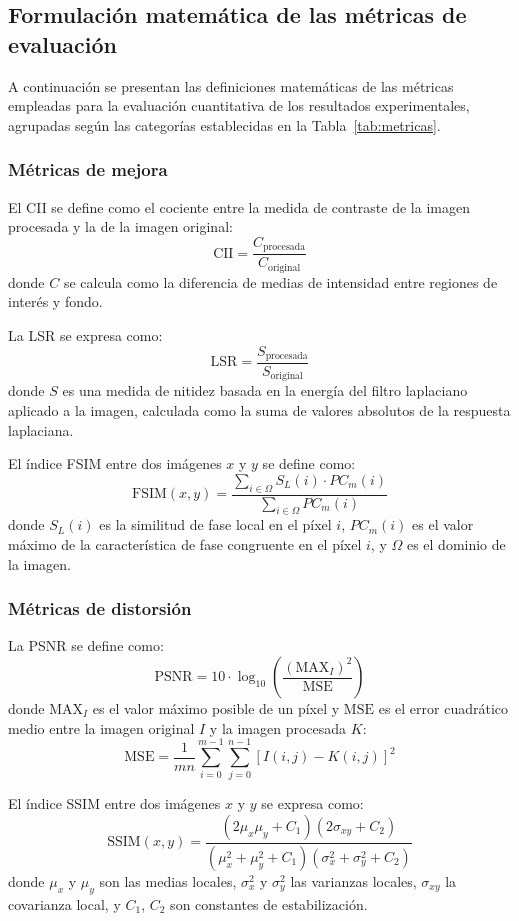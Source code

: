\subsection{Formulación matemática de las métricas de evaluación}

A continuación se presentan las definiciones matemáticas de las métricas empleadas para la evaluación cuantitativa de los resultados experimentales, agrupadas según las categorías establecidas en la Tabla~\ref{tab:metricas}.

\subsubsection{Métricas de mejora}

El CII se define como el cociente entre la medida de contraste de la imagen procesada y la de la imagen original:
\[
\mathrm{CII} = \frac{C_{\text{procesada}}}{C_{\text{original}}}
\]
donde \(C\) se calcula como la diferencia de medias de intensidad entre regiones de interés y fondo.

La LSR se expresa como:
\[
\mathrm{LSR} = \frac{S_{\text{procesada}}}{S_{\text{original}}}
\]
donde \(S\) es una medida de nitidez basada en la energía del filtro laplaciano aplicado a la imagen, calculada como la suma de valores absolutos de la respuesta laplaciana.

El índice FSIM entre dos imágenes \(x\) y \(y\) se define como:
\[
\mathrm{FSIM}(x, y) = \frac{\sum_{i \in \Omega} S_L(i) \cdot PC_m(i)}{\sum_{i \in \Omega} PC_m(i)}
\]
donde \(S_L(i)\) es la similitud de fase local en el píxel \(i\), \(PC_m(i)\) es el valor máximo de la característica de fase congruente en el píxel \(i\), y \(\Omega\) es el dominio de la imagen.

\subsubsection{Métricas de distorsión}

La PSNR se define como:
\[
\mathrm{PSNR} = 10 \cdot \log_{10} \left( \frac{(\mathrm{MAX}_I)^2}{\mathrm{MSE}} \right)
\]
donde \(\mathrm{MAX}_I\) es el valor máximo posible de un píxel y \(\mathrm{MSE}\) es el error cuadrático medio entre la imagen original \(I\) y la imagen procesada \(K\):
\[
\mathrm{MSE} = \frac{1}{mn} \sum_{i=0}^{m-1} \sum_{j=0}^{n-1} [I(i,j) - K(i,j)]^2
\]

El índice SSIM entre dos imágenes \(x\) y \(y\) se expresa como:
\[
\mathrm{SSIM}(x, y) = \frac{(2\mu_x\mu_y + C_1)(2\sigma_{xy} + C_2)}{(\mu_x^2 + \mu_y^2 + C_1)(\sigma_x^2 + \sigma_y^2 + C_2)}
\]
donde \(\mu_x\) y \(\mu_y\) son las medias locales, \(\sigma_x^2\) y \(\sigma_y^2\) las varianzas locales, \(\sigma_{xy}\) la covarianza local, y \(C_1\), \(C_2\) son constantes de estabilización.


